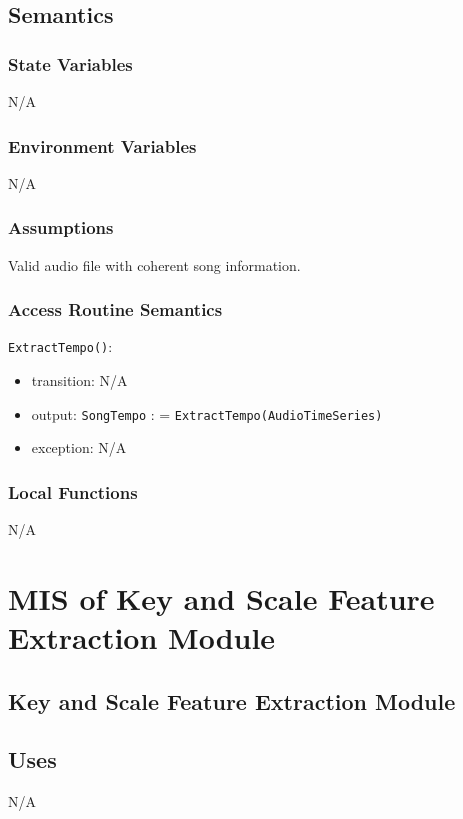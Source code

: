 \documentclass[12pt, titlepage]{article}
\begin{document}
\subsection{Semantics}

\subsubsection{State Variables}
N/A

\subsubsection{Environment Variables}
N/A

\subsubsection{Assumptions}
Valid audio file with coherent song information.

\subsubsection{Access Routine Semantics}

\noindent \texttt{ExtractTempo()}:
\begin{itemize}
\item transition: N/A
\item output: \texttt{Song\textunderscore Tempo} : = \texttt{ExtractTempo(Audio\textunderscore Time\textunderscore Series)}
\item exception: N/A
\end{itemize}

\subsubsection{Local Functions}
N/A



\section{MIS of Key and Scale Feature Extraction Module} 

\subsection{Key and Scale Feature Extraction Module}

\subsection{Uses}
N/A
\end{document}
